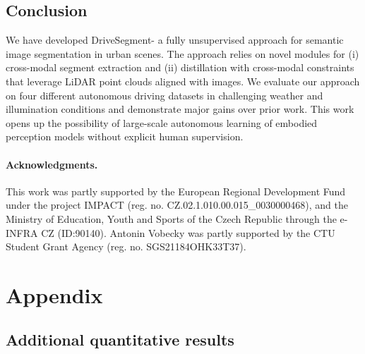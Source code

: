 \documentclass[runningheads]{llncs}
\newcommand{\ours}{DriveSegment\xspace}
\begin{document}
\section{Conclusion}
We have developed \ours - a fully unsupervised approach for semantic image segmentation in urban scenes. The approach relies on novel modules for (i) cross-modal segment extraction and (ii) distillation with cross-modal constraints that leverage LiDAR point clouds aligned with images. We evaluate our approach on four different autonomous driving datasets in challenging weather and illumination conditions and demonstrate major gains over prior work. This work opens up the possibility of large-scale autonomous learning of embodied perception models without explicit human supervision. 
 

\subsubsection{Acknowledgments.}
This work was partly supported by the European Regional Development Fund under the project IMPACT (reg. no. CZ.02.1.01\/0.0\/0.0\/15\_003\/0000468), and the Ministry of Education, Youth and Sports of the Czech Republic through the e-INFRA CZ (ID:90140). Antonin Vobecky was partly supported by the CTU Student Grant Agency (reg. no. SGS21\/184\/OHK3\/3T\/37). 




\clearpage
\chapter*{Appendix}
\vspace{-30pt}

\appendix
\setcounter{section}{0}
\renewcommand{\thesection}{\Alph{section}}

\renewcommand{\contentsname}{Table of Contents\vspace{-10pt}}
{
\hypersetup{linkcolor=black}
\tableofcontents
}











\section{Additional quantitative results}
\end{document}
